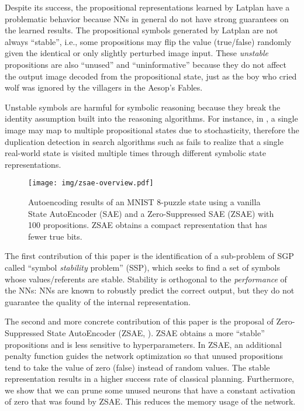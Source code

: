 Despite its success,
the propositional representations learned by Latplan have a problematic behavior
because NNs in general do not have strong guarantees on the learned results.
The propositional symbols generated by Latplan are not always
``stable'', i.e., some propositions may flip the value (true/false) randomly
given the identical or only slightly perturbed image input.
These \emph{unstable} propositions are also ``unused'' and ``uninformative''
because they do not affect the output image decoded from the propositional state,
just as the boy who cried wolf was ignored by the villagers in the Aesop's Fables.

Unstable symbols are harmful for symbolic reasoning because
they break the identity assumption built into the reasoning algorithms.
For instance, in \latentplanner, 
a single image may map to multiple propositional states due to stochasticity,
therefore the duplication detection in search algorithms such as \astar \cite{hart1968formal}
fails to realize that a single real-world state is visited multiple times through
different symbolic state representations.

\begin{figure}[tb]
 \centering
 \texttt{[image: img/zsae-overview.pdf]}
 \caption{
Autoencoding results of an MNIST 8-puzzle state
using a vanilla State AutoEncoder (SAE) \cite{Asai2018} and a Zero-Suppressed SAE (ZSAE) with 100 propositions.
ZSAE obtains a compact representation that has fewer true bits.}
 \label{zsae-overview}
\end{figure}

The first contribution of this paper is the identification of a sub-problem of SGP
called ``symbol \emph{stability} problem'' (SSP), which seeks to find a set of symbols
whose values/referents are stable.
Stability is orthogonal to the \emph{performance} of the NNs:
NNs are known to robustly predict the correct output, but they do not guarantee
the quality of the internal representation.

The second and more concrete contribution of this paper is
the proposal of Zero-Suppressed State AutoEncoder (ZSAE, ).
ZSAE obtains a more ``stable'' propositions and is less sensitive to hyperparameters.
In ZSAE, an additional penalty function
guides the network optimization so that unused propositions tend to 
take the value of zero (false) instead of random values.
The stable representation results in a higher success rate of classical planning.
Furthermore,
we show that we can prune some unused neurons
that have a constant activation of zero that was found by ZSAE.
This reduces the memory usage of the network.

